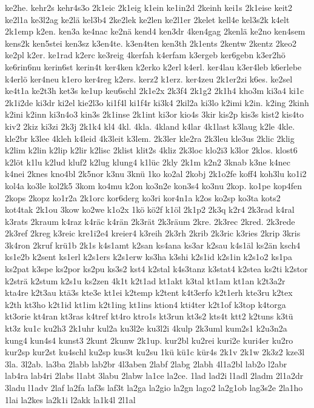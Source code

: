 {ke2he.
kehr2s
kehr4s3o
2k1eic
2k1eig
k1ein
ke1in2d
2keinh
kei1s
2k1eise
keit2
ke2l1a
ke3l2ag
ke2lä
kel3b4
2ke2lek
ke2len
ke2l1er
2kelet
kell4e
kel3s2k
k4elt
2k1emp
k2en.
ken3a
ke4nac
ke2nä
kend4
ken3dr
4ken4gag
2kenlä
ke2no
ken4sem
kens2k
ken5stei
ken3sz
k3en4te.
k3en4ten
ken3th
2k1ents
2kentw
2kentz
2keo2
ke2pl
k2er.
ke1rad
k2erc
ke3reig
4kerfah
k4erfam
k3ergeb
ker6gebn
k3er2hö
ke6rin6nu
kerin6st
kerin4t
ker4ken
k2erko
k2erl
k4erl.
ker4lau
k3er4leb
k6erlebe
k4erlö
ker4neu
k1ero
ker4reg
k2ers.
kerz2
k1erz.
ker4zeu
2k1er2zi
k6es.
ke2sel
ke4t1a
ke2t3h
ket3s
ke1up
keu6schl
2k1e2x
2k3f4
2k1g2
2k1h4
kho3m
ki3a4
ki1c
2k1i2de
ki3dr
ki2el
kie2l3o
ki1f4l
ki1f4r
ki3k4
2kil2a
ki3lo
k2imi
k2in.
k2ing
2kinh
k2ini
k2inn
ki3n4o3
kin3s
2k1inse
2k1int
ki3or
kio4s
3kir
kis2p
kis3s
kist2
kis4to
kiv2
2kiz
ki3zi
2k3j
2k1k4
kl4
4kl.
4kla.
4kland
k4lar
4k1last
k3laug
k2le
4kle.
kle2br
k3lee
4kleh
k4leid
4k3leit
k3lem.
2k3ler
kle2ra
2k3leu
kle3us
2klic
2klig
k2lim
k2lin
k2lip
k2lir
k2lisc
2klist
klit2s
4kliz
2k3loc
klo2i3
k3lor
2klos.
klost6
k2löt
k1lu
k2lud
kluf2
k2lug
klung4
k1lüc
2kly
2k1m
k2n2
3knab
k3ne
k4nec
k4nei
2knes
kno4bl
2k5nor
k3nu
3knü
1ko
ko2al
2kobj
2k1o2fe
koff4
koh3lu
ko1i2
kol4a
ko3le
kol2k5
3kom
ko4mu
k2on
ko3n2e
kon3s4
ko3nu
2kop.
ko1pe
kop4fen
2kops
2kopz
ko1r2a
2k1orc
kor6derg
ko3ri
kor4n1a
k2os
ko2sp
ko3ta
kots2
kot4tak
2k1ou
3kow
ko2we
k1o2x
1kö
kö2f
k1öl
2k1p2
2k3q
k2r4
2k3rad
k4ral
k3rats
2kraum
k4raz
k4räc
k4rän
2k3rät
2k3räum
2kre.
2k3rec
2kred.
2k3rede
2k3ref
2kreg
k3reic
kre1i2e4
kreier4
k3reih
2k3rh
2krib
2k3ric
k3ries
2krip
3kris
3k4ron
2kruf
krü1b
2k1s
k4s1amt
k2san
ks4ana
ks3ar
k2sau
k4s1äl
ks2än
ksch4
ks1e2b
k2sent
ks1erl
k2s1ers
k2s1erw
ks3ha
k3shi
k2s1id
k2s1in
k2s1o2
ks1pa
ks2pat
k3spe
ks2por
ks2pu
ks3s2
kst4
k2stal
k4s3tanz
k3stat4
k2stea
ks2ti
k2stor
k2strä
k2stum
k2s1u
ks2zen
4k1t
k2t1ad
kt1akt
k3tal
kt1am
kt1an
k2t3a2r
kta4re
k2t3au
ktä3s
kte3e
kt1ei
k2temp
k2tent
k4t3erfo
k2t1erh
kte3ru
k2tex
k2th
kt3ho
k2t1id
kt1im
k2t1ing
kt1ins
ktion4
kti4ter
k2t1of
k3top
k4torga
kt3orie
kt4ran
kt3ras
k4tref
kt4ro
ktro1s
kt3run
kt3s2
kts4t
ktt2
k2tuns
k3tü
kt3z
ku1c
ku2h3
2k1uhr
kul2a
ku3l2e
ku3l2i
4kulp
2k3uml
kum2s1
k2u3n2a
kung4
kun4s4
kunst3
2kunt
2kunw
2k1up.
kur2bl
ku2rei
kuri2e
kuri4er
ku2ro
kur2sp
kur2st
ku4schl
ku2sp
kus3t
ku2su
1kü
kü1c
kür4s
2k1v
2k1w
2k3z2
kze3l
3la.
3l2ab.
la3ba
2labb
lab2br
4l3aben
2labf
2labg
2labh
4l1a2bl
lab2o
l2abr
lab4ra
lab4ri
2labs
l1abt
3labu
2labw
la1ce
la2ce.
1lad
lad2i
l1adl
2ladm
2l1a2dr
3ladu
l1adv
2laf
la2fa
laf3s
laf3t
la2ga
la2gio
la2gn
lago2
la2g1ob
lag3s2e
2la1ho
1lai
la2kes
la2k1i
l2akk
la1k4l
2l1al
}
